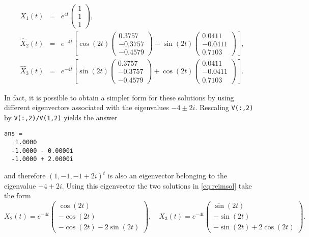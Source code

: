 \documentclass{ximera}
\begin{document}
\begin{eqnarray*}
X_1(t) & = & e^{4t}\left(\begin{array}{r} 1\\1\\1\end{array}\right),\\
\widehat{X}_2(t) & = & e^{-4t}\left[
\cos(2t)\left(\begin{array}{r}0.3757\\-0.3757\\-0.4579\end{array}\right)
-\sin(2t)\left(\begin{array}{r} 0.0411\\-0.0411\\0.7103\end{array}\right)
\right],\\
\widehat{X}_3(t) & = & e^{-4t}\left[
\sin(2t)\left(\begin{array}{r}0.3757\\-0.3757\\-0.4579\end{array}\right)
+\cos(2t)\left(\begin{array}{r} 0.0411\\-0.0411\\0.7103\end{array}\right)
\right].
\end{eqnarray*}


In fact, it is possible to obtain a simpler form for these solutions by 
using different eigenvectors associated with the eigenvalues $-4\pm 2i$.  
Rescaling {\tt V(:,2)} by {\tt V(:,2)/V(1,2)} yields the answer
\begin{verbatim}
ans =
   1.0000
  -1.0000 - 0.0000i
  -1.0000 + 2.0000i
\end{verbatim}
and therefore $(1,-1,-1+2i)^t$ is also an eigenvector belonging to the
eigenvalue $-4+2i$.  Using this eigenvector the two solutions in 
\eqref{eq:reimsol} take the form
\[
X_2(t) = e^{-4t}\left(\begin{array}{c}
\cos(2t)\\ -\cos(2t)\\ -\cos(2t)-2\sin(2t)\end{array}\right),\quad
X_3(t) = e^{-4t}\left(\begin{array}{c}
\sin(2t)\\ -\sin(2t)\\ -\sin(2t)+2\cos(2t)\end{array}\right).
\]
\end{document}
